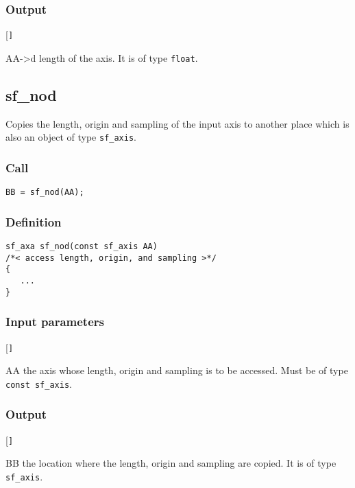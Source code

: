 \subsubsection*{Output}
\begin{desclist}{\tt }{\quad}[\tt ]
   \setlength\itemsep{0pt}  
   \item[AA->d] length of the axis. It is of type \texttt{float}.
\end{desclist}




\subsection{{sf\_nod}}
Copies the length, origin and sampling of the input axis to another place which is also an object of type \texttt{sf\_axis}.

\subsubsection*{Call}
\begin{verbatim}BB = sf_nod(AA);\end{verbatim}

\subsubsection*{Definition}
\begin{verbatim}  
sf_axa sf_nod(const sf_axis AA) 
/*< access length, origin, and sampling >*/
{
   ...
}
\end{verbatim}

\subsubsection{Input parameters}
\begin{desclist}{\tt }{\quad}[\tt ]
   \setlength\itemsep{0pt}
   \item[AA] the axis whose length, origin and sampling is to be accessed. Must be of type \texttt{const sf\_axis}.  
\end{desclist}

\subsubsection*{Output}
\begin{desclist}{\tt }{\quad}[\tt ]
   \setlength\itemsep{0pt}  
   \item[BB] the location where the length, origin and sampling are copied. It is of type \texttt{sf\_axis}.
\end{desclist}




